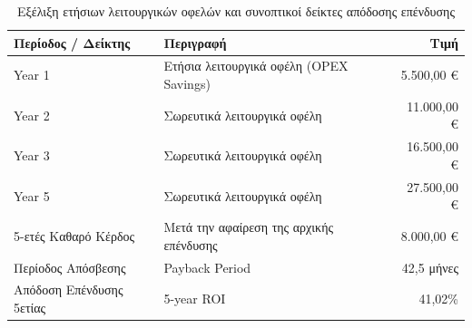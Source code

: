 \begin{table}[htbp]
\centering
\caption{Εξέλιξη ετήσιων λειτουργικών οφελών και συνοπτικοί δείκτες απόδοσης επένδυσης}
\label{tab:roi_projection}
\begin{tabular}{|l|l|r|}
\hline
\textbf{Περίοδος / Δείκτης} & \textbf{Περιγραφή} & \textbf{Τιμή} \\
\hline
\textlatin{Year 1} & Ετήσια λειτουργικά οφέλη (\textlatin{OPEX Savings}) & 5.500,00 \euro \\
\hline
\textlatin{Year 2} & Σωρευτικά λειτουργικά οφέλη & 11.000,00 \euro \\
\hline
\textlatin{Year 3} & Σωρευτικά λειτουργικά οφέλη & 16.500,00 \euro \\
\hline
\textlatin{Year 5} & Σωρευτικά λειτουργικά οφέλη & 27.500,00 \euro \\
\hline
5-ετές Καθαρό Κέρδος & Μετά την αφαίρεση της αρχικής επένδυσης & 8.000,00 \euro \\
\hline
Περίοδος Απόσβεσης & \textlatin{Payback Period} & 42,5 μήνες \\
\hline
Απόδοση Επένδυσης 5ετίας & \textlatin{5-year ROI} & 41,02\% \\
\hline
\end{tabular}
\end{table}





